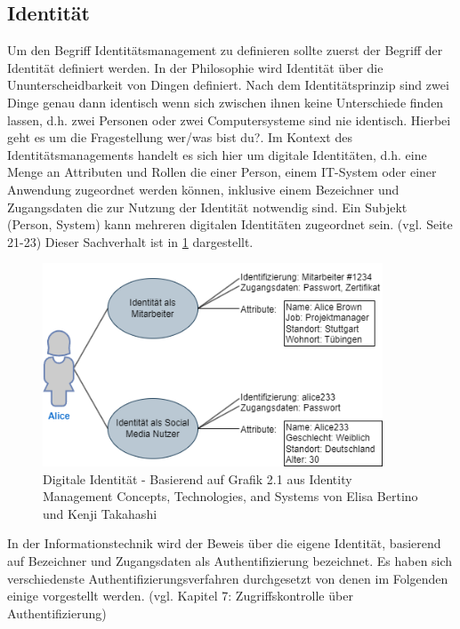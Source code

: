 \documentclass[11pt]{article}
\begin{document}
\subsection{Identität}
Um den Begriff Identitätsmanagement zu definieren sollte zuerst der Begriff der Identität definiert werden. In der Philosophie wird Identität über die Ununterscheidbarkeit von Dingen definiert. Nach dem Identitätsprinzip sind zwei Dinge genau dann identisch wenn sich zwischen ihnen keine Unterschiede finden lassen, d.h. zwei Personen oder zwei Computersysteme sind nie identisch. Hierbei geht es um die Fragestellung \glqq{}wer/was bist du?\grqq{}. Im Kontext des Identitätsmanagements handelt es sich hier um digitale Identitäten, d.h. eine Menge an Attributen und Rollen die einer Person, einem IT-System oder einer Anwendung zugeordnet werden können, inklusive einem Bezeichner und Zugangsdaten die zur Nutzung der Identität notwendig sind. Ein Subjekt (Person, System) kann mehreren digitalen Identitäten zugeordnet sein. (vgl. \cite{bertino2010identity} Seite 21-23) Dieser Sachverhalt ist in \cref{fig:identity} dargestellt.
\begin{figure}[H]
  \centering
  \includegraphics[width=0.9\textwidth]{assets/identity.png}
  \caption{Digitale Identität - Basierend auf Grafik 2.1 aus Identity Management Concepts, Technologies, and Systems von Elisa Bertino und Kenji Takahashi}\label{fig:identity}
\end{figure}
In der Informationstechnik wird der Beweis über die eigene Identität, basierend auf Bezeichner und Zugangsdaten als Authentifizierung bezeichnet. Es haben sich verschiedenste Authentifizierungsverfahren durchgesetzt von denen im Folgenden einige vorgestellt werden. (vgl. \cite{tsolkas2017} Kapitel 7: Zugriffskontrolle über Authentifizierung)
\end{document}
